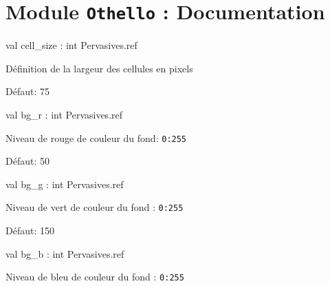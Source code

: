 \documentclass[11pt]{article}
\begin{document}
\newpage

\section{Module {\tt{Othello}} : Documentation}
\label{module:Othello}




\ocamldocvspace{0.5cm}



\label{val:Othello.cell-underscoresize}\begin{ocamldoccode}
val cell_size : int Pervasives.ref
\end{ocamldoccode}
\begin{ocamldocdescription}
Définition de la largeur des cellules en pixels


\end{ocamldocdescription}




Défaut: 75



\label{val:Othello.bg-underscorer}\begin{ocamldoccode}
val bg_r : int Pervasives.ref
\end{ocamldoccode}
\begin{ocamldocdescription}
Niveau de rouge de couleur du fond: {\tt{0:255}}


\end{ocamldocdescription}




Défaut: 50



\label{val:Othello.bg-underscoreg}\begin{ocamldoccode}
val bg_g : int Pervasives.ref
\end{ocamldoccode}
\begin{ocamldocdescription}
Niveau de vert de couleur du fond : {\tt{0:255}}


\end{ocamldocdescription}




Défaut: 150



\label{val:Othello.bg-underscoreb}\begin{ocamldoccode}
val bg_b : int Pervasives.ref
\end{ocamldoccode}
\begin{ocamldocdescription}
Niveau de bleu de couleur du fond : {\tt{0:255}}


\end{ocamldocdescription}
\end{document}
